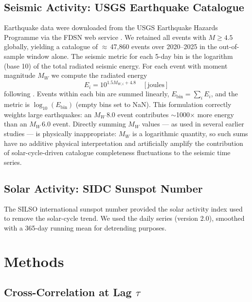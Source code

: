 \documentclass[12pt,a4paper]{article}
\begin{document}
\subsection{Seismic Activity: USGS Earthquake Catalogue}
\label{sec:usgs}

Earthquake data were downloaded from the USGS Earthquake Hazards Programme
via the FDSN web service \citep{USGS2024}.
We retained all events with $M \geq 4.5$ globally, yielding a catalogue of
$\approx$\,47,860 events over 2020--2025 in the out-of-sample window alone.
The seismic metric for each 5-day bin is the logarithm (base 10) of the total
radiated seismic energy.  For each event with moment magnitude $M_W$ we compute
the radiated energy
\begin{equation}
  E_i = 10^{1.5 M_{W,i} + 4.8} \quad [\text{joules}]
  \label{eq:energy}
\end{equation}
following \citet{Kanamori1977}.  Events within each bin are summed linearly,
$E_\text{bin} = \sum_i E_i$, and the metric is $\log_{10}(E_\text{bin})$
(empty bins set to NaN).
This formulation correctly weights large earthquakes: an $M_W\,8.0$ event
contributes $\sim$1000$\times$ more energy than an $M_W\,6.0$ event.
Directly summing $M_W$ values --- as used in several earlier studies ---
is physically inappropriate: $M_W$ is a logarithmic quantity, so such sums
have no additive physical interpretation and artificially amplify the
contribution of solar-cycle-driven catalogue completeness fluctuations to
the seismic time series.

\subsection{Solar Activity: SIDC Sunspot Number}
\label{sec:sidc}

The SILSO international sunspot number \citep{SIDC2024} provided the solar
activity index used to remove the solar-cycle trend.
We used the daily series (version 2.0), smoothed with a 365-day running mean
for detrending purposes.

\section{Methods}
\label{sec:methods}

\subsection{Cross-Correlation at Lag $\tau$}
\label{sec:xcorr}
\end{document}
